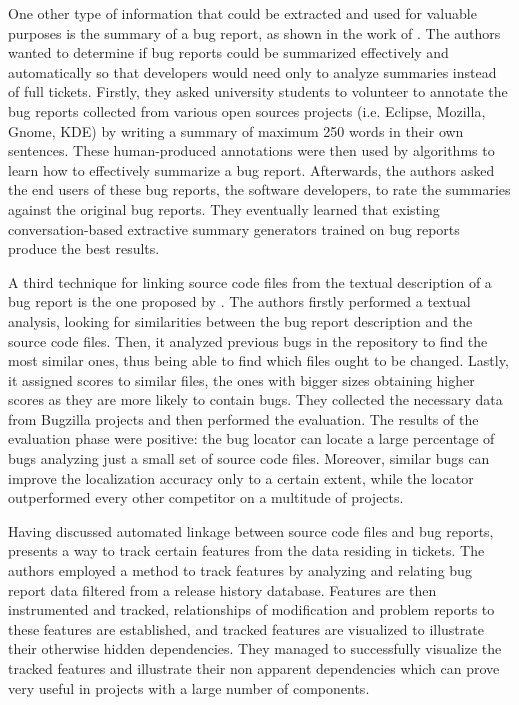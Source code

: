 \documentclass{mprop}
\begin{document}
One other type of information that could be extracted and used for valuable
purposes is the summary of a bug report, as shown in the work of 
\citet{rastkar2010summarizing}. The authors wanted to determine if bug reports
could be summarized effectively and automatically so that developers would
need only to analyze summaries instead of full tickets. Firstly, they asked
university students to volunteer to annotate the bug reports collected from
various open sources projects (i.e. Eclipse, Mozilla, Gnome, KDE) by writing
a summary of maximum 250 words in their own sentences. These human-produced 
annotations were then used by algorithms to learn how to effectively summarize a 
bug report.  Afterwards, the authors asked the end users of these bug reports, the 
software developers, to rate the summaries against the original bug reports.
They eventually learned that existing conversation-based extractive summary
generators trained on bug reports produce the best results.

A third technique for linking source code files from the textual description of a 
bug report is the one proposed by \citet{zhou2012should}. The authors
firstly performed a textual analysis, looking for similarities between the bug 
report description and the source code files. Then, it analyzed previous bugs in 
the repository to find the most similar ones, thus being able to find which files 
ought to be changed. Lastly, it assigned scores to similar files, the ones with 
bigger sizes obtaining higher scores as they are more likely to contain bugs. They 
collected the necessary data from Bugzilla projects and then performed the 
evaluation. The results of the evaluation phase were positive: the bug locator
can locate a large percentage of bugs analyzing just a small set of source code
files. Moreover, similar bugs can improve the localization accuracy only to a 
certain extent, while the locator outperformed every other competitor on a 
multitude of projects. 

Having discussed automated linkage between source code files and bug reports, 
\citet{fischer2003analyzing} presents a way to track certain features from the
data residing in tickets. The authors employed a method to track features by 
analyzing and relating bug report data filtered from a release history database.
Features are then instrumented and tracked, relationships of modification and 
problem reports to these features are established, and tracked features are
visualized to illustrate their otherwise hidden dependencies. They managed to 
successfully visualize the tracked features and illustrate their non apparent
dependencies which can prove very useful in projects with a large number of
components.
\end{document}
